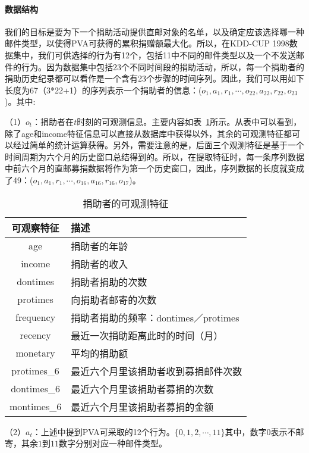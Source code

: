 \paragraph{数据结构}
我们的目标是要为下一个捐助活动提供直邮对象的名单，以及确定应该选择哪一种邮件类型，以使得PVA可获得的累积捐赠额最大化。所以，在KDD-CUP 1998数据集中，我们可供选择的行为有12个，包括11中不同的邮件类型以及一个不发送邮件的行为。因为数据集中包括23个不同时间段的捐助活动，所以，每一个捐助者的捐助历史纪录都可以看作是一个含有23个步骤的时间序列。因此，我们可以用如下长度为67（3*22+1）的序列表示一个捐助者的信息：($o_{1}, a_{1}, r_{1},\cdots,o_{22}, a_{22}, r_{22}, o_{23}$)。其中:

（1）$o_{t}$：捐助者在$t$时刻的可观测信息。主要内容如表~\ref{tab:obser_donors}所示。从表中可以看到，除了age和income特征信息可以直接从数据库中获得以外，其余的可观测特征都可以经过简单的统计运算获得。另外，需要注意的是，后面三个观测特征是基于一个时间周期为六个月的历史窗口总结得到的。所以，在提取特征时，每一条序列数据中前六个月的直邮募捐数据将作为第一个历史窗口，因此，序列数据的长度就变成了49：($o_{1}, a_{1}, r_{1},\cdots,o_{16}, a_{16}, r_{16}, o_{17}$)。
\begin{table}[htbp]
  \centering
  \caption{捐助者的可观测特征}
  \label{tab:obser_donors}
  \begin{tabular}{cl}
    \toprule
      可观察特征 & 描述 \\
    \midrule
      age & 捐助者的年龄 \\
      income & 捐助者的收入 \\
      dontimes & 捐助者捐助的次数 \\
      protimes & 向捐助者邮寄的次数 \\
      frequency & 捐助者捐助的频率：dontimes／protimes\\
      recency & 最近一次捐助距离此时的时间（月） \\
      monetary & 平均的捐助额 \\
      protimes_6 & 最近六个月里该捐助者收到募捐邮件次数 \\
      dontimes_6 & 最近六个月里该捐助者募捐的次数 \\
      montimes_6 & 最近六个月里该捐助者募捐的金额 \\
    \bottomrule
  \end{tabular}
\end{table}

（2）$a_{t}$：上述中提到PVA可采取的12个行为。$\{0,1,2,\cdots,11\}$其中，数字$0$表示不邮寄，其余$1$到$11$数字分别对应一种邮件类型。

